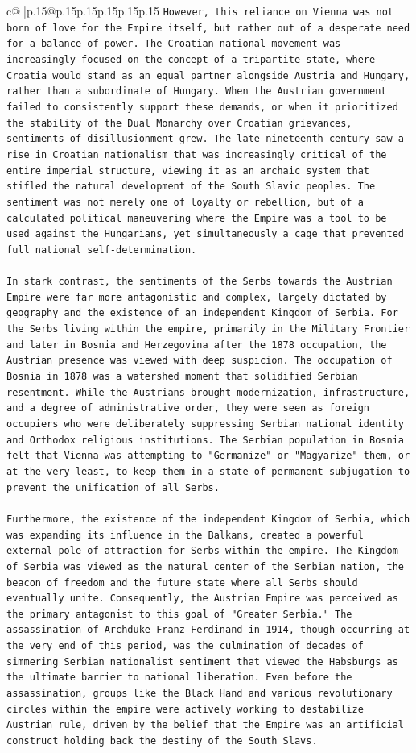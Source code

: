 \documentclass{article}
\begin{document}
{\begin{supertabular}{c@{$\;$}|p{.15\linewidth}@{}p{.15\linewidth}p{.15\linewidth}p{.15\linewidth}p{.15\linewidth}p{.15\linewidth}}
{{{\texttt{However, this reliance on Vienna was not born of love for the Empire itself, but rather out of a desperate need for a balance of power. The Croatian national movement was increasingly focused on the concept of a tripartite state, where Croatia would stand as an equal partner alongside Austria and Hungary, rather than a subordinate of Hungary. When the Austrian government failed to consistently support these demands, or when it prioritized the stability of the Dual Monarchy over Croatian grievances, sentiments of disillusionment grew. The late nineteenth century saw a rise in Croatian nationalism that was increasingly critical of the entire imperial structure, viewing it as an archaic system that stifled the natural development of the South Slavic peoples. The sentiment was not merely one of loyalty or rebellion, but of a calculated political maneuvering where the Empire was a tool to be used against the Hungarians, yet simultaneously a cage that prevented full national self{-}determination.} \\
\\ 
\texttt{In stark contrast, the sentiments of the Serbs towards the Austrian Empire were far more antagonistic and complex, largely dictated by geography and the existence of an independent Kingdom of Serbia. For the Serbs living within the empire, primarily in the Military Frontier and later in Bosnia and Herzegovina after the 1878 occupation, the Austrian presence was viewed with deep suspicion. The occupation of Bosnia in 1878 was a watershed moment that solidified Serbian resentment. While the Austrians brought modernization, infrastructure, and a degree of administrative order, they were seen as foreign occupiers who were deliberately suppressing Serbian national identity and Orthodox religious institutions. The Serbian population in Bosnia felt that Vienna was attempting to "Germanize" or "Magyarize" them, or at the very least, to keep them in a state of permanent subjugation to prevent the unification of all Serbs.} \\
\\ 
\texttt{Furthermore, the existence of the independent Kingdom of Serbia, which was expanding its influence in the Balkans, created a powerful external pole of attraction for Serbs within the empire. The Kingdom of Serbia was viewed as the natural center of the Serbian nation, the beacon of freedom and the future state where all Serbs should eventually unite. Consequently, the Austrian Empire was perceived as the primary antagonist to this goal of "Greater Serbia." The assassination of Archduke Franz Ferdinand in 1914, though occurring at the very end of this period, was the culmination of decades of simmering Serbian nationalist sentiment that viewed the Habsburgs as the ultimate barrier to national liberation. Even before the assassination, groups like the Black Hand and various revolutionary circles within the empire were actively working to destabilize Austrian rule, driven by the belief that the Empire was an artificial construct holding back the destiny of the South Slavs.} \\
}}}
\end{supertabular}}
\end{document}
